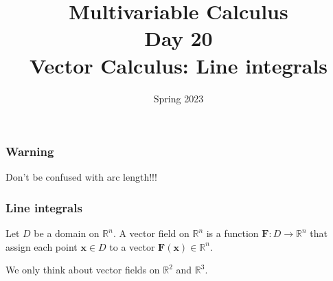 \documentclass[aspectratio=169]{beamer}
\title{ Multivariable Calculus \\ Day  20 \\ Vector Calculus: Line integrals}
\date{Spring 2023}
\newcommand{\vect}{\mathbf}
\newcommand{\R}{\mathbb{R}}
\begin{document}
\maketitle

\begin{frame}
    \frametitle{ Warning}
    Don't be confused with arc length!!!
\end{frame}

\begin{frame}
    \frametitle{Line integrals}
    \begin{definition}
        Let $D$ be a domain on $\R^n$.
        A vector field on $\R^n$ is a function $\vect{F}: D \to \R^n$
        that assign each point $\vect{x}\in D$ to a vector $\vect{F}(\vect{x}) \in \R^n$.
    \end{definition}
    We only think about vector fields on $\R^2$ and $\R^3$.
\end{frame}
\end{document}

